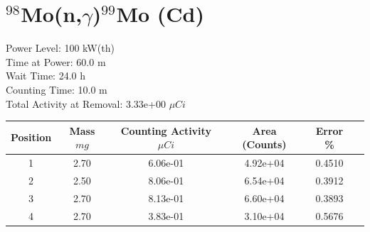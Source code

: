 \newpage

\section*{ $^{98}$Mo(n,$\gamma$)$^{99}$Mo (Cd) }

Power Level: 100 kW(th) \\
Time at Power: 60.0 m \\
Wait Time: 24.0 h \\
Counting Time: 10.0 m \\
Total Activity at Removal: 3.33e+00 $\mu Ci$

\begin{table}[h]
\centering
\begin{tabular}{ |c|c|c|c|c|c| }
 \hline
 Position & Mass $mg$ & Counting Activity $\mu Ci$ & Area (Counts) & Error \% \\
 \hline 
 1 & 2.70 & 6.06e-01 & 4.92e+04 & 0.4510 \\ 
\hline
 2 & 2.50 & 8.06e-01 & 6.54e+04 & 0.3912 \\ 
\hline
 3 & 2.70 & 8.13e-01 & 6.60e+04 & 0.3893 \\ 
\hline
 4 & 2.70 & 3.83e-01 & 3.10e+04 & 0.5676 \\ 
\hline
\end{tabular}
\end{table}

